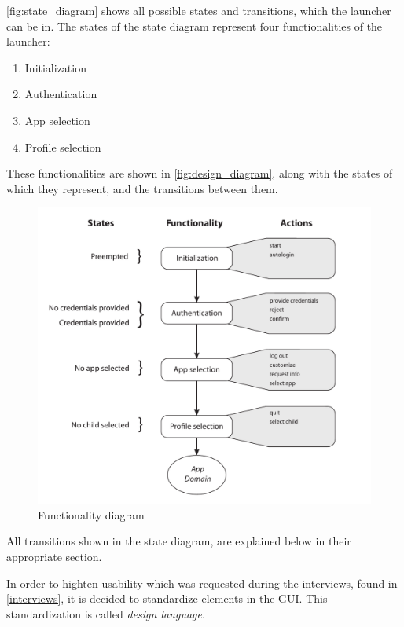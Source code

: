 \autoref{fig:state_diagram} shows all possible states and transitions, which the launcher can be in. 
The states of the state diagram represent four functionalities of the launcher:

\begin{enumerate}
	\item Initialization
	\item Authentication
	\item App selection
	\item Profile selection
\end{enumerate}


These functionalities are shown in \autoref{fig:design_diagram}, along with the states of which they represent, and the transitions between them.



\begin{figure}[h]
	\centering
	\includegraphics[width=1\textwidth]{gfx/design_diagram.pdf}
	\caption{Functionality diagram}
	\label{fig:design_diagram}
\end{figure}

All transitions shown in the state diagram, are explained below in their appropriate section.

In order to highten usability which was requested during the interviews, found in \autoref{interviews}, it is decided to standardize elements in the GUI. This standardization is called \emph{design language}.